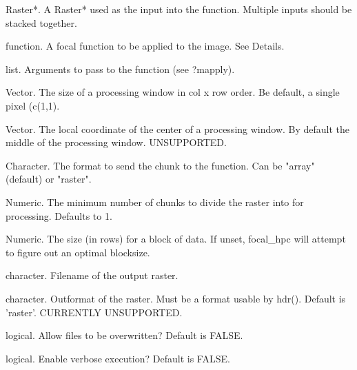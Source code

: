 \documentclass[a4paper]{book}
\begin{document}
\begin{Arguments}
\begin{ldescription}
\item[\code{x}] Raster*. A Raster* used as the input into the
function.  Multiple inputs should be stacked together.

\item[\code{fun}] function. A focal function to be applied to
the image. See Details.

\item[\code{args}] list. Arguments to pass to the function (see
?mapply).

\item[\code{window\_dims}] Vector. The size of a processing
window in col x row order.  Be default, a single pixel
(c(1,1).

\item[\code{window\_center}] Vector. The local coordinate of the
center of a processing window.  By default the middle of
the processing window.  UNSUPPORTED.

\item[\code{chunk\_format}] Character. The format to send the
chunk to the function.  Can be "array" (default) or
"raster".

\item[\code{minblocks}] Numeric. The minimum number of chunks to
divide the raster into for processing.  Defaults to 1.

\item[\code{blocksize}] Numeric. The size (in rows) for a block
of data.  If unset, focal\_hpc will attempt to figure out
an optimal blocksize.

\item[\code{filename}] character. Filename of the output
raster.

\item[\code{outformat}] character. Outformat of the raster. Must
be a format usable by hdr(). Default is 'raster'.
CURRENTLY UNSUPPORTED.

\item[\code{overwrite}] logical. Allow files to be overwritten?
Default is FALSE.

\item[\code{verbose}] logical. Enable verbose execution? Default
is FALSE.
\end{ldescription}
\end{Arguments}
%
\end{document}
